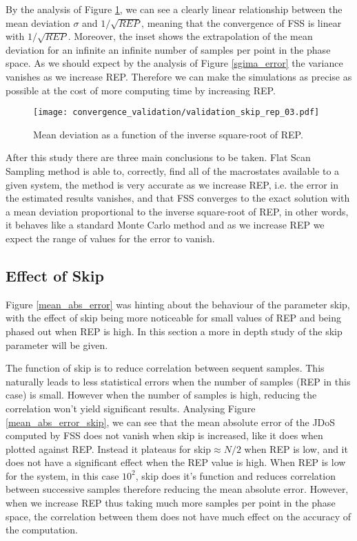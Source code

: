 	By the analysis of Figure \ref{sigma_rep}, we can see a clearly linear relationship between the mean deviation $\sigma$ and $1/\sqrt{REP}$, meaning that the convergence of FSS is linear with $1/\sqrt{REP}$. Moreover, the inset shows the extrapolation of the mean deviation for an infinite an infinite number of samples per point in the phase space. As we should expect by the analysis of Figure \ref{sgima_error} the variance vanishes as we increase REP. Therefore we can make the simulations as precise as possible at the cost of more computing time by increasing REP.
	
\begin{figure}[h]
	\centering
	\texttt{[image: convergence\_validation/validation\_skip\_rep\_03.pdf]}
	\caption{Mean deviation as a function of the inverse square-root of REP.}
	\label{sigma_rep}
\end{figure}

	After this study there are three main conclusions to be taken. Flat Scan Sampling method is able to, correctly, find all of the macrostates available to a given system, the method is very accurate as we increase REP, i.e. the error in the estimated results vanishes, and that FSS converges to the exact solution with a mean deviation proportional to the inverse square-root of REP, in other words, it behaves like a standard Monte Carlo method and as we increase REP we expect the range of values for the error to vanish.
	
\subsection{Effect of Skip}

	Figure \ref{mean_abs_error} was hinting about the behaviour of the parameter skip, with the effect of skip being more noticeable for small values of REP and being phased out when REP is high. In this section a more in depth study of the skip parameter will be given.

	The function of skip is to reduce correlation between sequent samples. This naturally leads to less statistical errors when the number of samples (REP in this case) is small. However when the number of samples is high, reducing the correlation won't yield significant results. 
	Analysing Figure \ref{mean_abs_error_skip}, we can see that the mean absolute error of the JDoS computed by FSS does not vanish when skip is increased, like it does when plotted against REP. Instead it plateaus for skip$\approx N/2$ when REP is low, and it does not have a significant effect when the REP value is high. 
	When REP is low for the system, in this case $10^2$, skip does it's function and reduces correlation between successive samples therefore reducing the mean absolute error. However, when we increase REP thus taking much more samples per point in the phase space, the correlation between them does not have much effect on the accuracy of the computation. 
	
